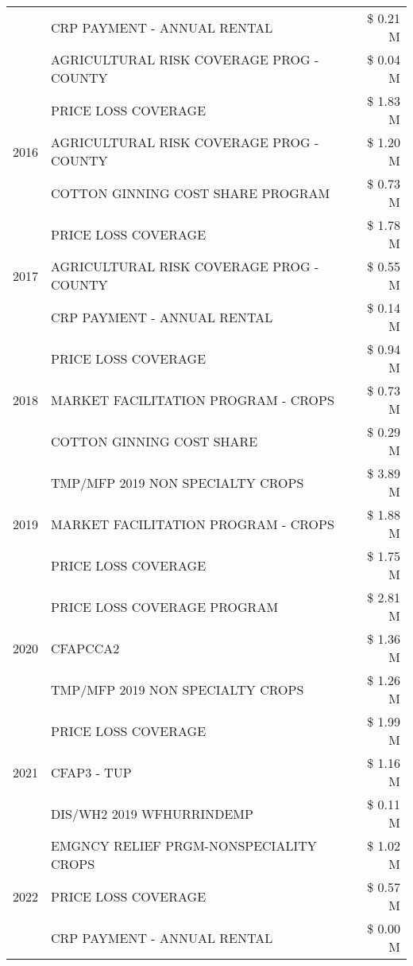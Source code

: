 \begin{tabular}{llr}
 & CRP PAYMENT - ANNUAL RENTAL & \$ 0.21 M \\
 & AGRICULTURAL RISK COVERAGE PROG - COUNTY & \$ 0.04 M \\
\cline{1-3}
\multirow[t]{3}{*}{2016} & PRICE LOSS COVERAGE & \$ 1.83 M \\
 & AGRICULTURAL RISK COVERAGE PROG - COUNTY & \$ 1.20 M \\
 & COTTON GINNING COST SHARE PROGRAM & \$ 0.73 M \\
\cline{1-3}
\multirow[t]{3}{*}{2017} & PRICE LOSS COVERAGE & \$ 1.78 M \\
 & AGRICULTURAL RISK COVERAGE PROG - COUNTY & \$ 0.55 M \\
 & CRP PAYMENT - ANNUAL RENTAL & \$ 0.14 M \\
\cline{1-3}
\multirow[t]{3}{*}{2018} & PRICE LOSS COVERAGE & \$ 0.94 M \\
 & MARKET FACILITATION PROGRAM - CROPS & \$ 0.73 M \\
 & COTTON GINNING COST SHARE & \$ 0.29 M \\
\cline{1-3}
\multirow[t]{3}{*}{2019} & TMP/MFP 2019 NON SPECIALTY CROPS & \$ 3.89 M \\
 & MARKET FACILITATION PROGRAM - CROPS & \$ 1.88 M \\
 & PRICE LOSS COVERAGE & \$ 1.75 M \\
\cline{1-3}
\multirow[t]{3}{*}{2020} & PRICE LOSS COVERAGE PROGRAM & \$ 2.81 M \\
 & CFAPCCA2 & \$ 1.36 M \\
 & TMP/MFP 2019 NON SPECIALTY CROPS & \$ 1.26 M \\
\cline{1-3}
\multirow[t]{3}{*}{2021} & PRICE LOSS COVERAGE & \$ 1.99 M \\
 & CFAP3 - TUP & \$ 1.16 M \\
 & DIS/WH2 2019 WFHURRINDEMP & \$ 0.11 M \\
\cline{1-3}
\multirow[t]{3}{*}{2022} & EMGNCY RELIEF PRGM-NONSPECIALITY CROPS & \$ 1.02 M \\
 & PRICE LOSS COVERAGE & \$ 0.57 M \\
 & CRP PAYMENT - ANNUAL RENTAL & \$ 0.00 M \\
\cline{1-3}
\bottomrule
\end{tabular}
